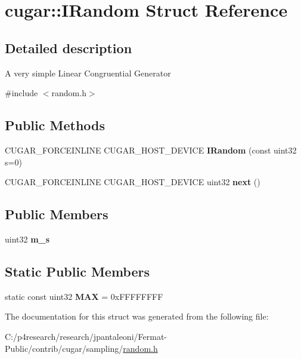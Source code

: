 \hypertarget{structcugar_1_1_i_random}{}\section{cugar\+:\+:I\+Random Struct Reference}
\label{structcugar_1_1_i_random}


\subsection{Detailed description}
A very simple Linear Congruential Generator 

{\ttfamily \#include $<$random.\+h$>$}

\subsection*{Public Methods}
\begin{DoxyCompactItemize}
\item 
\mbox{\label{structcugar_1_1_i_random_a10f27720bb2dee32def830a6df117668}} 
C\+U\+G\+A\+R\+\_\+\+F\+O\+R\+C\+E\+I\+N\+L\+I\+NE C\+U\+G\+A\+R\+\_\+\+H\+O\+S\+T\+\_\+\+D\+E\+V\+I\+CE {\bfseries I\+Random} (const uint32 s=0)
\item 
\mbox{\label{structcugar_1_1_i_random_ac9747d2966323ec286eb38effd54f736}} 
C\+U\+G\+A\+R\+\_\+\+F\+O\+R\+C\+E\+I\+N\+L\+I\+NE C\+U\+G\+A\+R\+\_\+\+H\+O\+S\+T\+\_\+\+D\+E\+V\+I\+CE uint32 {\bfseries next} ()
\end{DoxyCompactItemize}
\subsection*{Public Members}
\begin{DoxyCompactItemize}
\item 
\mbox{\label{structcugar_1_1_i_random_af2d6b59babcc5749b83ec05b4cb85728}} 
uint32 {\bfseries m\+\_\+s}
\end{DoxyCompactItemize}
\subsection*{Static Public Members}
\begin{DoxyCompactItemize}
\item 
\mbox{\label{structcugar_1_1_i_random_abe57d325de0eca8329b6c2fcbd504e1e}} 
static const uint32 {\bfseries M\+AX} = 0x\+F\+F\+F\+F\+F\+F\+FF
\end{DoxyCompactItemize}


The documentation for this struct was generated from the following file\+:\begin{DoxyCompactItemize}
\item 
C\+:/p4research/research/jpantaleoni/\+Fermat-\/\+Public/contrib/cugar/sampling/\hyperlink{random_8h}{random.\+h}\end{DoxyCompactItemize}
